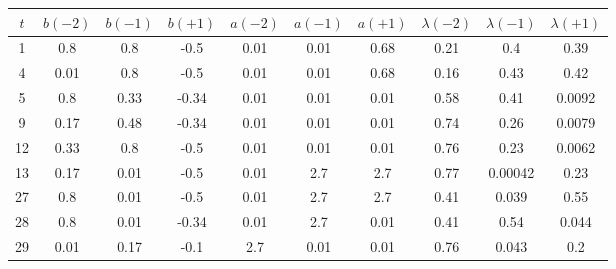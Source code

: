 \begin{small}\begin{tabular}{c|c|c|c|c|c|c|c|c|c|}
\hline
\textbf{$t$}&\textbf{$b(-2)$}&\textbf{$b(-1)$}&\textbf{$b(+1)$}&\textbf{$a(-2)$}&\textbf{$a(-1)$}&\textbf{$a(+1)$}&\textbf{$\lambda(-2)$}&\textbf{$\lambda(-1)$}&\textbf{$\lambda(+1)$}\\\hline
1&0.8&0.8&-0.5&0.01&0.01&0.68&0.21&0.4&0.39\\\hline4&0.01&0.8&-0.5&0.01&0.01&0.68&0.16&0.43&0.42\\\hline5&0.8&0.33&-0.34&0.01&0.01&0.01&0.58&0.41&0.0092\\\hline9&0.17&0.48&-0.34&0.01&0.01&0.01&0.74&0.26&0.0079\\\hline12&0.33&0.8&-0.5&0.01&0.01&0.01&0.76&0.23&0.0062\\\hline13&0.17&0.01&-0.5&0.01&2.7&2.7&0.77&0.00042&0.23\\\hline27&0.8&0.01&-0.5&0.01&2.7&2.7&0.41&0.039&0.55\\\hline28&0.8&0.01&-0.34&0.01&2.7&0.01&0.41&0.54&0.044\\\hline29&0.01&0.17&-0.1&2.7&0.01&0.01&0.76&0.043&0.2\\\hline\end{tabular}
\end{small}